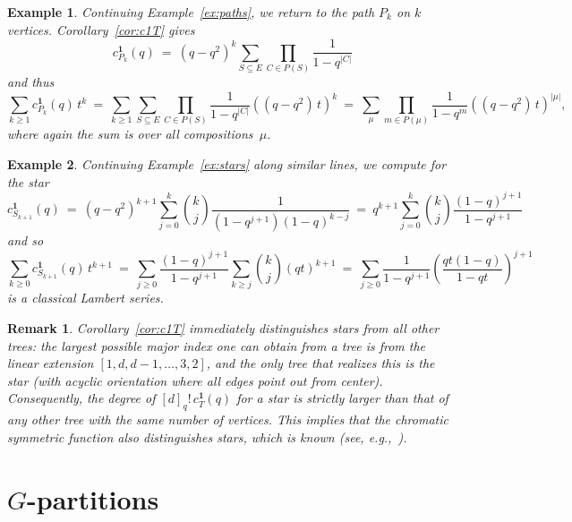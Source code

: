 \documentclass[11pt]{amsart}
\newtheorem{exam}{Example}
\newenvironment{example}{\begin{exam}\sf}{\end{exam}}
\newtheorem{rem}{Remark}
\newenvironment{remark}{\begin{rem}\sf}{\end{rem}}
\newcommand\bone{\mathbf{1}}
\begin{document}
\begin{example}
Continuing Example~\ref{ex:paths}, we return to the path $P_k$ on $k$ vertices.
Corollary~\ref{cor:c1T} gives 
\[
  c^{ \bone }_{ P_k } (q)
  \ = \ (q-q^2)^{ k } \sum_{S\subseteq E} \prod_{ C \in P(S) } \frac{ 1 }{ 1 - q^{ |C| } }
\]
and thus
\[
  \sum_{ k \ge 1 } c^{ \bone }_{ P_k } (q) \, t^k
  \ = \ \sum_{ k \ge 1 } \sum_{S\subseteq E} \prod_{ C \in P(S) } \frac{ 1 }{ 1 - q^{ |C| } }
\left( (q-q^2) \, t \right)^k
  \ = \ \sum_{ \mu } \prod_{m \in P(\mu)} \frac{ 1 }{ 1 - q^{ m } } \left( (q-q^2) \, t
\right)^{ |\mu| },
\]
where again the sum is over all compositions~$\mu$.
\end{example}

\begin{example}
Continuing Example~\ref{ex:stars} along similar lines, we compute for the star
\[
  c^{ \bone }_{ S_{k+1} } (q)
  \ = \ (q-q^2)^{ k+1 } \sum_{ j=0 }^{ k } \binom k j \frac{ 1 }{ (1-q^{ j+1 }) (1-q)^{ k-j }  } 
  \ = \ q^{ k+1 } \sum_{ j=0 }^{ k } \binom k j \frac{ (1-q)^{ j+1 } }{ 1-q^{ j+1 } } 
\]
and so
\[
  \sum_{ k \ge 0 } c^{ \bone }_{ S_{ k+1 } } (q) \, t^{k+1}
  \ = \ \sum_{ j \ge 0 } \frac{ (1-q)^{ j+1 } }{ 1-q^{ j+1 } } \sum_{ k \ge j } \binom k j
(qt)^{ k+1 }
  \ = \ \sum_{ j \ge 0 } \frac{ 1 }{ 1-q^{ j+1 } } \left( \frac{ qt(1-q) }{ 1-qt } \right)^{ j+1 }
\]
is a classical Lambert series.
\end{example}

\begin{remark}\label{rem:starleadingcoeff}
Corollary~\ref{cor:c1T} immediately distinguishes stars from all other trees: the
largest possible major index one can obtain from a tree is from the linear extension
$[1,d,d-1,\hdots,3,2]$, and the only tree that realizes this is the star (with acyclic orientation where all edges point out from center). 
Consequently, the degree of $[d]_q! \, c^{\bone }_T (q)$ for a star is strictly larger than that of any other tree with the same number of vertices.
This implies that the chromatic symmetric function also distinguishes stars, which is
known (see, e.g.,~\cite{gonzalesorellanatomba,MartinMorinWagner}).
\end{remark}


\section{$G$-partitions}\label{sec:gpartitions}
\end{document}
